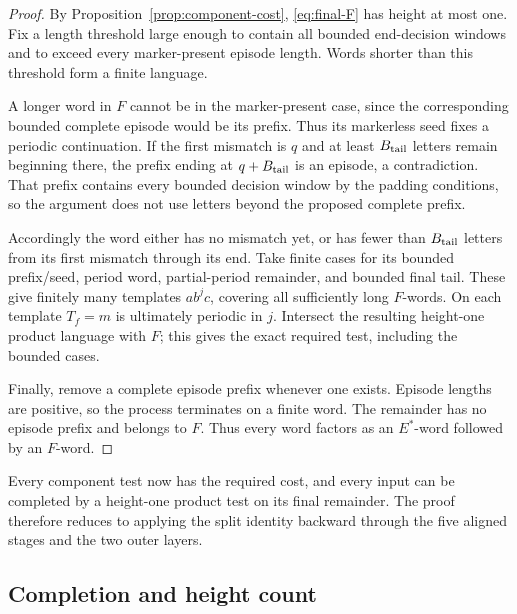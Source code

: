 \begin{proof}
By Proposition~\ref{prop:component-cost}, \eqref{eq:final-F} has height at most
one. Fix a length threshold large enough to contain all bounded end-decision
windows and to exceed every marker-present episode length. Words shorter
than this threshold form a finite language.

A longer word in \(F\) cannot be in the marker-present case, since the
corresponding bounded complete episode would be its prefix. Thus its
markerless seed fixes a periodic continuation. If the first mismatch is \(q\)
and at least \(B_{\rm tail}\) letters remain beginning there, the prefix
ending at \(q+B_{\rm tail}\) is an episode, a contradiction.
That prefix contains every bounded decision window by the padding conditions,
so the argument does not use letters beyond the proposed complete prefix.

Accordingly the word either has no mismatch yet, or has fewer than
\(B_{\rm tail}\) letters from its first mismatch through its end.
Take finite cases for its bounded prefix/seed, period word, partial-period
remainder, and bounded final tail. These give finitely many templates
\(ab^jc\), covering all sufficiently long \(F\)-words.
On each template \(T_f=m\) is ultimately periodic in \(j\).
Intersect the resulting height-one product language with \(F\); this gives
the exact required test, including the bounded cases.

Finally, remove a complete episode prefix whenever one exists.
Episode lengths are positive, so the process terminates on a finite word.
The remainder has no episode prefix and belongs to \(F\).
Thus every word factors as an \(E^*\)-word followed by an \(F\)-word.
\end{proof}

Every component test now has the required cost, and every input can be
completed by a height-one product test on its final remainder. The proof
therefore reduces to applying the split identity backward through the
five aligned stages and the two outer layers.

\subsection{Completion and height count}

